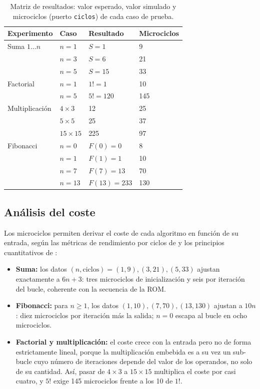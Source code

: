 \documentclass[llncs]{llncs}
\begin{document}
\begin{table}[t]
\centering
\caption{Matriz de resultados: valor esperado, valor simulado y
microciclos (puerto \texttt{ciclos}) de cada caso de prueba.}
\label{tab:resultados}
\begin{tabular}{llll}
\hline
Experimento & Caso & Resultado & Microciclos \\
\hline
Suma $1 \dots n$ & $n=1$  & $S = 1$   & 9  \\
                 & $n=3$  & $S = 6$   & 21 \\
                 & $n=5$  & $S = 15$  & 33 \\
Factorial        & $n=1$  & $1! = 1$  & 10 \\
                 & $n=5$  & $5! = 120$ & 145 \\
Multiplicación   & $4 \times 3$  & 12  & 25 \\
                 & $5 \times 5$  & 25  & 37 \\
                 & $15 \times 15$ & 225 & 97 \\
Fibonacci        & $n=0$  & $F(0) = 0$   & 8  \\
                 & $n=1$  & $F(1) = 1$   & 10 \\
                 & $n=7$  & $F(7) = 13$  & 70 \\
                 & $n=13$ & $F(13) = 233$ & 130 \\
\hline
\end{tabular}
\end{table}

\subsection{Análisis del coste}

Los microciclos permiten derivar el coste de cada algoritmo en función
de su entrada, según las métricas de rendimiento por ciclos de
\cite{stallings2015coa} y los principios cuantitativos de
\cite{hennessy2017qa}:

\begin{itemize}
  \item \textbf{Suma:} los datos $(n, \mathrm{ciclos}) = (1,9), (3,21),
    (5,33)$ ajustan exactamente a $6n + 3$: tres microciclos de
    inicialización y seis por iteración del bucle, coherente con la
    secuencia de la ROM.
  \item \textbf{Fibonacci:} para $n \ge 1$, los datos $(1,10), (7,70),
    (13,130)$ ajustan a $10n$: diez microciclos por iteración más la
    salida; $n=0$ escapa al bucle en ocho microciclos.
  \item \textbf{Factorial y multiplicación:} el coste crece con la
    entrada pero no de forma estrictamente lineal, porque la
    multiplicación embebida es a su vez un sub-bucle cuyo número de
    iteraciones depende del valor de los operandos, no solo de su
    cantidad. Así, pasar de $4 \times 3$ a $15 \times 15$ multiplica el
    coste por casi cuatro, y $5!$ exige 145 microciclos frente a los 10
    de $1!$.
\end{itemize}
\end{document}
